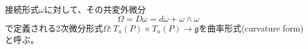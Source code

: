 	\begin{dfn}[曲率形式]
		接続形式$\omega$に対して、その共変外微分
			\[\Omega = D\omega = d\omega + \omega \wedge \omega\]
		で定義される2次微分形式$\Omega: T_u(P) \times T_u(P) \rightarrow \mathfrak{g}$を曲率形式(curvature form)と呼ぶ。
	\end{dfn}



